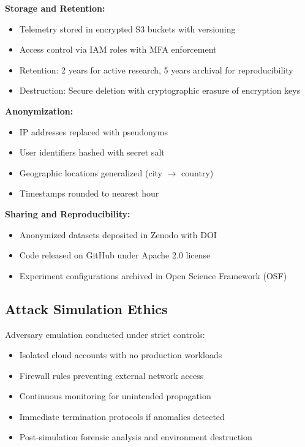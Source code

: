 \textbf{Storage and Retention:}
\begin{itemize}
    \item Telemetry stored in encrypted S3 buckets with versioning
    \item Access control via IAM roles with MFA enforcement
    \item Retention: 2 years for active research, 5 years archival for reproducibility
    \item Destruction: Secure deletion with cryptographic erasure of encryption keys
\end{itemize}

\textbf{Anonymization:}
\begin{itemize}
    \item IP addresses replaced with pseudonyms
    \item User identifiers hashed with secret salt
    \item Geographic locations generalized (city $\rightarrow$ country)
    \item Timestamps rounded to nearest hour
\end{itemize}

\textbf{Sharing and Reproducibility:}
\begin{itemize}
    \item Anonymized datasets deposited in Zenodo with DOI
    \item Code released on GitHub under Apache 2.0 license
    \item Experiment configurations archived in Open Science Framework (OSF)
\end{itemize}

\subsection{Attack Simulation Ethics}
Adversary emulation conducted under strict controls:
\begin{itemize}
    \item Isolated cloud accounts with no production workloads
    \item Firewall rules preventing external network access
    \item Continuous monitoring for unintended propagation
    \item Immediate termination protocols if anomalies detected
    \item Post-simulation forensic analysis and environment destruction
\end{itemize}

